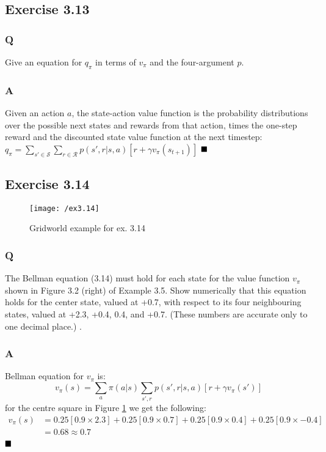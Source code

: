 \subsection{Exercise 3.13}
\subsubsection*{Q}
Give an equation for $q_\pi$ in terms of $v_\pi$ and the four-argument $p$.  

\subsubsection*{A}
Given an action $a$, the state-action value function is the probability distributions over the possible next states and rewards from that action, times the one-step reward and the discounted state value function at the next timestep:
$
q_\pi = \sum_{s' \in \mathcal{S}} \sum_{r \in \mathcal{R}} p(s', r | s, a) [r + \gamma v_\pi(s_{t+1})]
$
$
\hfill \blacksquare
$

\subsection{Exercise 3.14}
\begin{figure}[h!]
	\centering
	\texttt{[image: /ex3.14]}
	\caption{Gridworld example for ex. 3.14}
	\label{fig:3.14}
\end{figure}

\subsubsection*{Q}
The Bellman equation (3.14) must hold for each state for the value function $v_\pi$ shown in Figure 3.2 (right) of Example 3.5. Show numerically that this equation holds for the center state, valued at +0.7, with respect to its four neighbouring states, valued at +2.3, +0.4, 0.4, and +0.7. (These numbers are accurate only to one decimal place.) .  

\subsubsection*{A}
Bellman equation for $v_\pi$ is:
\begin{equation}
v_\pi(s) = \sum_{a} \pi(a | s) \sum_{s', r} p(s', r | s, a) [r + \gamma v_\pi(s')] 
\end{equation}
for the centre square in Figure \ref{fig:3.14} we get the following:
\begin{align}
v_\pi(s) &= 0.25 \left[0.9 \times 2.3\right] + 0.25 \left[0.9 \times 0.7\right] + 0.25 \left[0.9 \times 0.4\right] + 0.25 \left[0.9 \times -0.4\right] \\
			&= 0.68 \approx 0.7 \\
\end{align}
$
\hfill \blacksquare
$

